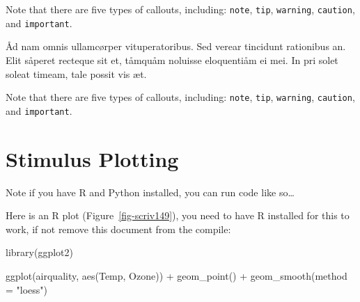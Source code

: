 \documentclass[
  12pt,
  a4paper,
  numbers=noenddot,
  titlepage,
  toclink=all,
  toc=bibliography]{scrbook}
\newenvironment{Shaded}{\begin{snugshade}}{\end{snugshade}}
\newcommand{\AttributeTok}[1]{\textcolor[rgb]{0.40,0.45,0.13}{#1}}
\newcommand{\FunctionTok}[1]{\textcolor[rgb]{0.28,0.35,0.67}{#1}}
\newcommand{\NormalTok}[1]{\textcolor[rgb]{0.00,0.23,0.31}{#1}}
\newcommand{\SpecialCharTok}[1]{\textcolor[rgb]{0.37,0.37,0.37}{#1}}
\newcommand{\StringTok}[1]{\textcolor[rgb]{0.13,0.47,0.30}{#1}}
\theoremstyle{definition}
\theoremstyle{definition}
\theoremstyle{definition}
\theoremstyle{plain}
\theoremstyle{plain}
\theoremstyle{plain}
\theoremstyle{plain}
\theoremstyle{plain}
\theoremstyle{remark}
\begin{document}
\begin{tcolorbox}[enhanced jigsaw, bottomtitle=1mm, titlerule=0mm, coltitle=black, title=\textcolor{quarto-callout-important-color}{\faExclamation}\hspace{0.5em}{Important}, opacityback=0, colframe=quarto-callout-important-color-frame, breakable, colbacktitle=quarto-callout-important-color!10!white, left=2mm, toptitle=1mm, arc=.35mm, toprule=.15mm, rightrule=.15mm, bottomrule=.15mm, colback=white, leftrule=.75mm, opacitybacktitle=0.6]

Note that there are five types of callouts, including: \texttt{note},
\texttt{tip}, \texttt{warning}, \texttt{caution}, and
\texttt{important}.

\end{tcolorbox}

Åd nam omnis ullamcørper vituperatoribus. Sed verear tincidunt
rationibus an. Elit såperet recteque sit et, tåmquåm noluisse
eloquentiåm ei mei. In pri solet soleat timeam, tale possit vis æt.

\begin{tcolorbox}[enhanced jigsaw, bottomtitle=1mm, titlerule=0mm, coltitle=black, title=\textcolor{quarto-callout-note-color}{\faInfo}\hspace{0.5em}{Note}, opacityback=0, colframe=quarto-callout-note-color-frame, breakable, colbacktitle=quarto-callout-note-color!10!white, left=2mm, toptitle=1mm, arc=.35mm, toprule=.15mm, rightrule=.15mm, bottomrule=.15mm, colback=white, leftrule=.75mm, opacitybacktitle=0.6]

Note that there are five types of callouts, including: \texttt{note},
\texttt{tip}, \texttt{warning}, \texttt{caution}, and
\texttt{important}.

\end{tcolorbox}

\hypertarget{sec-scriv149}{%
\section{Stimulus Plotting}\label{sec-scriv149}}

\protect\hypertarget{scriv149}{}{}

Note if you have R and Python installed, you can run code like
so\ldots{}

Here is an R plot
(\protect\hypertarget{cite_18}{}{\label{cite_18}Figure~\ref{fig-scriv149}}),
you need to have R installed for this to work, if not remove this
document from the compile:

\begin{Shaded}
\begin{Highlighting}[numbers=left,,]
\FunctionTok{library}\NormalTok{(ggplot2)}

\FunctionTok{ggplot}\NormalTok{(airquality, }\FunctionTok{aes}\NormalTok{(Temp, Ozone)) }\SpecialCharTok{+} 
  \FunctionTok{geom\_point}\NormalTok{() }\SpecialCharTok{+} 
  \FunctionTok{geom\_smooth}\NormalTok{(}\AttributeTok{method =} \StringTok{"loess"}\NormalTok{)}
\end{Highlighting}
\end{Shaded}
\end{document}
